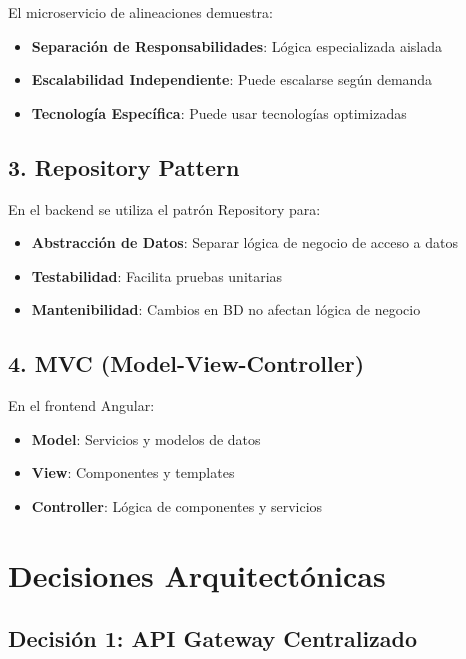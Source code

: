 \documentclass[
  spanish,
  11pt,
  letterpaper,
]{book}
\providecommand{\tightlist}{%
  \setlength{\itemsep}{0pt}\setlength{\parskip}{0pt}}
\begin{document}
El microservicio de alineaciones demuestra:

\begin{itemize}
\tightlist
\item
  \textbf{Separación de Responsabilidades}: Lógica especializada aislada
\item
  \textbf{Escalabilidad Independiente}: Puede escalarse según demanda
\item
  \textbf{Tecnología Específica}: Puede usar tecnologías optimizadas
\end{itemize}

\subsection{3. Repository Pattern}\label{repository-pattern}

En el backend se utiliza el patrón Repository para:

\begin{itemize}
\tightlist
\item
  \textbf{Abstracción de Datos}: Separar lógica de negocio de acceso a
  datos
\item
  \textbf{Testabilidad}: Facilita pruebas unitarias
\item
  \textbf{Mantenibilidad}: Cambios en BD no afectan lógica de negocio
\end{itemize}

\subsection{4. MVC
(Model-View-Controller)}\label{mvc-model-view-controller}

En el frontend Angular:

\begin{itemize}
\tightlist
\item
  \textbf{Model}: Servicios y modelos de datos
\item
  \textbf{View}: Componentes y templates
\item
  \textbf{Controller}: Lógica de componentes y servicios
\end{itemize}

\section{Decisiones
Arquitectónicas}\label{decisiones-arquitectuxf3nicas}

\subsection{Decisión 1: API Gateway
Centralizado}\label{decisiuxf3n-1-api-gateway-centralizado}
\end{document}
